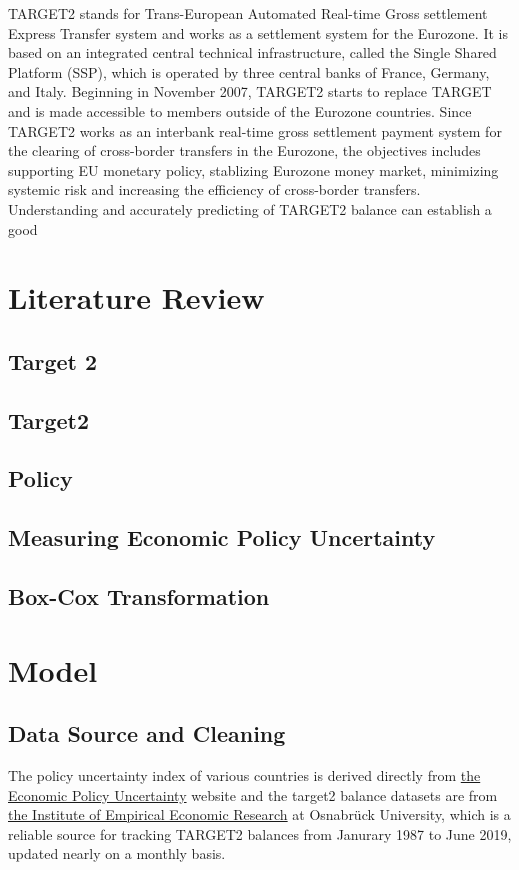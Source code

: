 \documentclass[12pt]{article}
\begin{document}
TARGET2 stands for Trans-European Automated Real-time Gross settlement Express Transfer system and works as a settlement system for the Eurozone. It is based on an integrated central technical infrastructure, called the Single Shared Platform (SSP), which is operated by three central banks of France, Germany, and Italy. Beginning in November 2007, TARGET2 starts to replace TARGET and is made accessible to members outside of the Eurozone countries. Since TARGET2 works as an interbank real-time gross settlement payment system for the clearing of cross-border transfers in the Eurozone, the objectives includes supporting EU monetary policy, stablizing Eurozone money market, minimizing systemic risk and increasing the efficiency of cross-border transfers. Understanding and accurately predicting of TARGET2 balance can establish a good 



\section{Literature Review} \label{sec:literature}
\subsection{Target 2}
\subsection{Target2}
\subsection{ Policy}
\subsection{Measuring Economic Policy Uncertainty}
\subsection{Box-Cox Transformation}

\section{Model} \label{sec:model}
\subsection{Data Source and Cleaning}

The policy uncertainty index of various countries is derived directly from \href{https://www.policyuncertainty.com/monetary.html}{the Economic Policy Uncertainty} website and the target2 balance datasets are from \href{http://www.eurocrisismonitor.com}{the Institute of Empirical Economic Research} at Osnabrück University, which is a reliable source for tracking TARGET2 balances from Janurary 1987 to June 2019, updated nearly on a monthly basis. 
\end{document}
